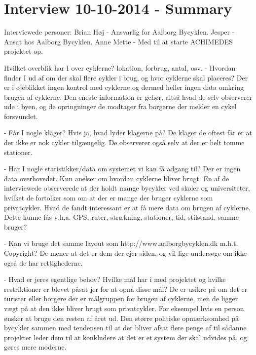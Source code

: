 \chapter{Interview 10-10-2014 - Summary}
\label{interviewReferat}
Interviewede personer:
Brian Høj - Ansvarlig for Aalborg Bycyklen.
Jesper - Ansat hos Aalborg Bycyklen.
Anne Mette - Med til at starte ACHIMEDES projektet op.

Hvilket overblik har I over cyklerne? lokation, forbrug, antal, osv.
- Hvordan finder I ud af om der skal flere cykler i brug, og hvor cyklerne skal placeres?
Der er i øjeblikket ingen kontrol med cyklerne og dermed heller ingen  data omkring brugen
af cyklerne. Den eneste information er gehør, altså hvad de selv observerer ude i byen,
og de opringninger de modtager fra borgerne der melder en cykel forsvundet.

- Får I nogle klager? Hvis ja, hvad lyder klagerne på?
De klager de oftest får er at der ikke er nok cykler tilgængelig. De observerer også selv
at der er helt tomme stationer.

- Har I nogle statistikker/data om systemet vi kan få adgang til?
Der er ingen data overhovedet. Kun anelser om hvordan cyklerne bliver brugt. En af de interviewede
observerede at der holdt mange bycykler ved skoler og universiteter, hvilket de fortolker som om
at der er mange der bruger cyklerne som privatcykler.
Hvad de fandt interessant er at få mere data om brugen af cyklerne. Dette kunne fås v.h.a. GPS, ruter, strækning, stationer, tid, 
stilstand, samme bruger?

- Kan vi bruge det samme layout som http://www.aalborgbycyklen.dk m.h.t. Copyright?
De mener at det er dem der ejer siden, og vil lige undersøge om ikke også de har rettighederne.

- Hvad er jeres egentlige behov? Hvilke mål har i med projektet og hvilke restriktioner er blevet påsat jer for at opnå disse mål?
De er usikre på om det er turister eller borgere der er målgruppen for brugen af cyklerne, men de ligger vægt på at den ikke
bliver brugt som privatcykler. For eksempel hvis en person ønsker at bruge den resten af året ud.
Den større politiske opmærksomhed på bycykler sammen med tendensen til at der bliver afsat flere penge af til sådanne projekter
leder dem til at konkludere at det er et system der skal udvides på, og gøres mere moderne.

